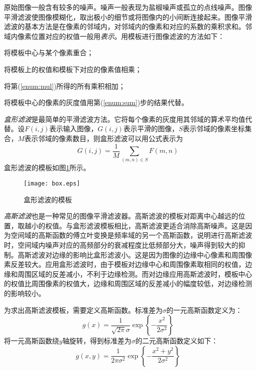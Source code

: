 原始图像一般含有较多的噪声。噪声一般表现为盐椒噪声或孤立的点线噪声。图像平滑滤波使图像模糊化，取出极小的细节或将图像内的小间断连接起来。图像平滑滤波的基本方法是在像素的邻域内，对邻域内的像素和对应的系数的乘积求和。邻域内像素位置对应的权值一般用\emph{表示}。用模板进行图像滤波的方法如下：
\begin{asparaenum}[(1)]
\item 将模板中心与某个像素重合；
\item\label{enum:mul} 将模板上的权值和模板下对应的像素值相乘；
\item\label{enum:sum} 将第(\ref{enum:mul})所得的所有乘积相加；
\item 将模板中心的像素的灰度值用第(\ref{enum:sum})步的结果代替。
\end{asparaenum}


\emph{盒形滤波}是最简单的平滑滤波方法。它将每个像素的灰度用其邻域的算术平均值代替。设$F(i,j)$表示输入图像，$G(i,j)$表示平滑的图像，$S$表示邻域的像素坐标集合，$M$表示邻域的像素数目，则盒形滤波可以用公式表示为
\begin{equation}
  G(i,j)=\frac{1}{M}\sum_{(m,n)\in S}F(m,n)
\end{equation}
盒形滤波的模板如图\ref{fig:box}所示。
\begin{figure}[!h]
  \centering
  \texttt{[image: box.eps]}
  \caption{盒形滤波的模板}
  \label{fig:box}
\end{figure}

\emph{高斯滤波}也是一种常见的图像平滑滤波器。高斯滤波的模板对距离中心越远的位置，取越小的权值。与盒形滤波模板相比，高斯滤波更适合消除高斯噪声。这是因为空间域的高斯函数的傅立叶变换是频率域的另一个高斯函数，说明进行高斯滤波时，空间域内噪声对应的高频部分的衰减程度比低频部分大，噪声得到较大的抑制。高斯滤波对边缘的影响比盒形滤波小。这是因为图像的边缘中心像素和周围像素反差较大。应用盒形滤波时，由于模板对边缘中心和周围像素取相同的权值，边缘和周围区域的反差减小，不利于边缘检测。而对边缘应用高斯滤波时，模板中心的权值比周围像素的权值大，边缘和周围区域的反差减小的幅度较低，对边缘检测的影响较小。

为求出高斯滤波模板，需要定义高斯函数。标准差为$\sigma$的一元高斯函数定义为：
\begin{equation}
  \label{eq:gauss1}
  g(x)=\frac{1}{\sqrt{2\pi}\sigma}\exp\left\{-\frac{x^2}{2\sigma^2}\right\}
\end{equation}
将一元高斯函数绕$y$轴旋转，得到标准差为$\sigma$的二元高斯函数定义如下：
\begin{equation}
  \label{eq:gauss2}
  g(x,y)=\frac{1}{2\pi\sigma^2}\exp\left\{-\frac{x^2+y^2}{2\sigma^2}\right\}
\end{equation}

